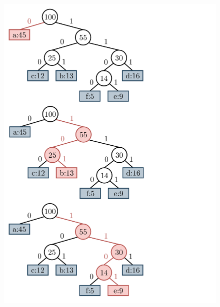 \begin{figure}
    	\centering
    	\begin{minipage}{1\textwidth}
    		\centering
    		\begin{minipage}{0.45\textwidth}
    			\centering
    			\includegraphics[scale=.45, clip, trim=10 560 200 10]{img/graphs-huffmanBack.pdf}
    			

\end{minipage}
\end{minipage}
\end{figure}
